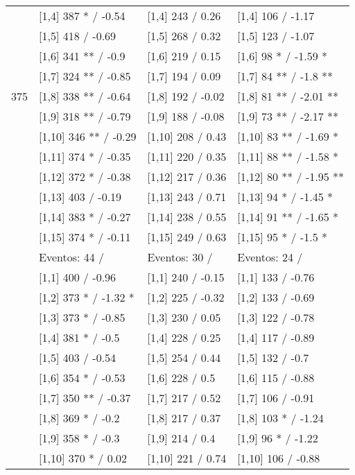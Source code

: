 \begin{table}
\begin{tabular}[t]{llll}
\addlinespace
 & {}[1,4] 387 * / -0.54 & {}[1,4] 243  / 0.26 & {}[1,4] 106  / -1.17\\
 & {}[1,5] 418  / -0.69 & {}[1,5] 268  / 0.32 & {}[1,5] 123  / -1.07\\
 & {}[1,6] 341 ** / -0.9 & {}[1,6] 219  / 0.15 & {}[1,6] 98 * / -1.59 *\\
 & {}[1,7] 324 ** / -0.85 & {}[1,7] 194  / 0.09 & {}[1,7] 84 ** / -1.8 **\\
375 & {}[1,8] 338 ** / -0.64 & {}[1,8] 192  / -0.02 & {}[1,8] 81 ** / -2.01 **\\
\addlinespace
 & {}[1,9] 318 ** / -0.79 & {}[1,9] 188  / -0.08 & {}[1,9] 73 ** / -2.17 **\\
 & {}[1,10] 346 ** / -0.29 & {}[1,10] 208  / 0.43 & {}[1,10] 83 ** / -1.69 *\\
 & {}[1,11] 374 * / -0.35 & {}[1,11] 220  / 0.35 & {}[1,11] 88 ** / -1.58 *\\
 & {}[1,12] 372 * / -0.38 & {}[1,12] 217  / 0.36 & {}[1,12] 80 ** / -1.95 **\\
 & {}[1,13] 403  / -0.19 & {}[1,13] 243  / 0.71 & {}[1,13] 94 * / -1.45 *\\
\addlinespace
 & {}[1,14] 383 * / -0.27 & {}[1,14] 238  / 0.55 & {}[1,14] 91 ** / -1.65 *\\
 & {}[1,15] 374 * / -0.11 & {}[1,15] 249  / 0.63 & {}[1,15] 95 * / -1.5 *\\
 & Eventos:  44 / & Eventos:  30 / & Eventos:  24 /\\
 & {}[1,1] 400  / -0.96 & {}[1,1] 240  / -0.15 & {}[1,1] 133  / -0.76\\
 & {}[1,2] 373 * / -1.32 * & {}[1,2] 225  / -0.32 & {}[1,2] 133  / -0.69\\
\addlinespace
 & {}[1,3] 373 * / -0.85 & {}[1,3] 230  / 0.05 & {}[1,3] 122  / -0.78\\
 & {}[1,4] 381 * / -0.5 & {}[1,4] 228  / 0.25 & {}[1,4] 117  / -0.89\\
 & {}[1,5] 403  / -0.54 & {}[1,5] 254  / 0.44 & {}[1,5] 132  / -0.7\\
 & {}[1,6] 354 * / -0.53 & {}[1,6] 228  / 0.5 & {}[1,6] 115  / -0.88\\
 & {}[1,7] 350 ** / -0.37 & {}[1,7] 217  / 0.52 & {}[1,7] 106  / -0.91\\
\addlinespace
500 & {}[1,8] 369 * / -0.2 & {}[1,8] 217  / 0.37 & {}[1,8] 103 * / -1.24\\
 & {}[1,9] 358 * / -0.3 & {}[1,9] 214  / 0.4 & {}[1,9] 96 * / -1.22\\
 & {}[1,10] 370 * / 0.02 & {}[1,10] 221  / 0.74 & {}[1,10] 106  / -0.88\\

\end{tabular}
\end{table}
